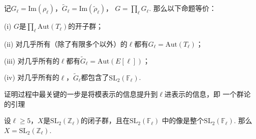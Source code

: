 

    

\begin{cthm}
    记$G_{\ell} = \mathrm{Im}(\rho_{\ell})$，$\tilde{G}_{\ell}=\mathrm{Im}(\tilde{\rho}_{\ell})$，
    $G=\prod_{\ell} G_{\ell}$. 那么以下命题等价：

    (i) $G$是$\prod_{\ell}\mathrm{Aut}(T_{\ell})$的开子群；

    (ii) 对几乎所有（除了有限多个以外）的$\ell$都有$G_{\ell} = \mathrm{Aut}(T_{\ell})$；

    (iii) 对几乎所有的$\ell$都有$\tilde{G}_{\ell}=\mathrm{Aut}(E[\ell])$；

    (iv) 对几乎所有的$\ell$，$\tilde{G}_{\ell}$都包含了$\mathrm{SL}_2(\mathbb{F}_{\ell})$.
\end{cthm}

证明过程中最关键的一步是将模表示的信息提升到$\ell$进表示的信息，即
一个群论的引理
\begin{clem}
    设$\ell\geq 5$，$X$是$\mathrm{SL}_2(\mathbb{Z}_{\ell})$的闭子群，且在$\mathrm{SL}_2(\mathbb{F}_{\ell})$
    中的像是整个$\mathrm{SL}_2(\mathbb{F}_{\ell})$. 那么$X = \mathrm{SL}_2(\mathbb{Z}_{\ell})$.
\end{clem}

